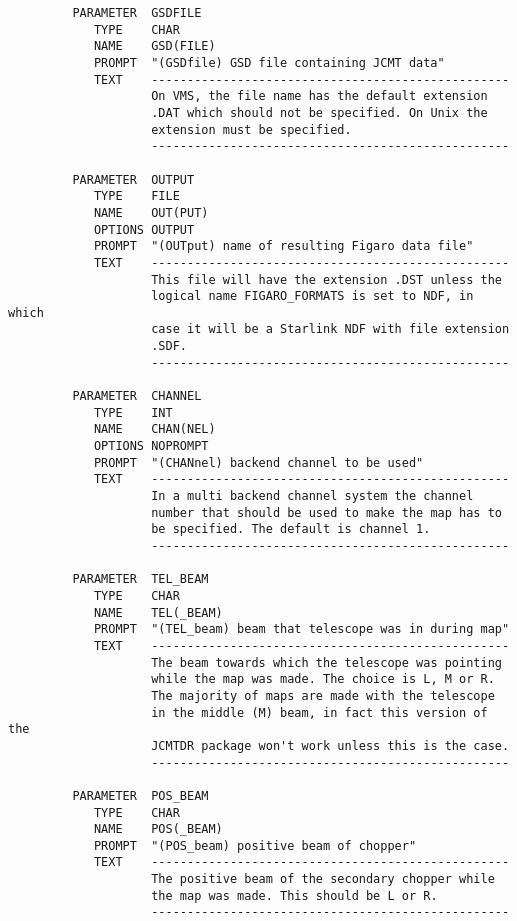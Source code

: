 \begin{small}
\begin{verbatim}
         PARAMETER  GSDFILE
            TYPE    CHAR
            NAME    GSD(FILE)
            PROMPT  "(GSDfile) GSD file containing JCMT data"
            TEXT    --------------------------------------------------
                    On VMS, the file name has the default extension
                    .DAT which should not be specified. On Unix the
                    extension must be specified.
                    --------------------------------------------------

         PARAMETER  OUTPUT
            TYPE    FILE
            NAME    OUT(PUT)
            OPTIONS OUTPUT
            PROMPT  "(OUTput) name of resulting Figaro data file"
            TEXT    --------------------------------------------------
                    This file will have the extension .DST unless the
                    logical name FIGARO_FORMATS is set to NDF, in which
                    case it will be a Starlink NDF with file extension
                    .SDF.
                    --------------------------------------------------

         PARAMETER  CHANNEL
            TYPE    INT
            NAME    CHAN(NEL)
            OPTIONS NOPROMPT
            PROMPT  "(CHANnel) backend channel to be used"
            TEXT    --------------------------------------------------
                    In a multi backend channel system the channel
                    number that should be used to make the map has to
                    be specified. The default is channel 1.
                    --------------------------------------------------

         PARAMETER  TEL_BEAM
            TYPE    CHAR
            NAME    TEL(_BEAM)
            PROMPT  "(TEL_beam) beam that telescope was in during map"
            TEXT    --------------------------------------------------
                    The beam towards which the telescope was pointing
                    while the map was made. The choice is L, M or R.
                    The majority of maps are made with the telescope
                    in the middle (M) beam, in fact this version of the
                    JCMTDR package won't work unless this is the case.
                    --------------------------------------------------

         PARAMETER  POS_BEAM
            TYPE    CHAR
            NAME    POS(_BEAM)
            PROMPT  "(POS_beam) positive beam of chopper"
            TEXT    --------------------------------------------------
                    The positive beam of the secondary chopper while
                    the map was made. This should be L or R.
                    --------------------------------------------------
\end{verbatim}
\end{small}

